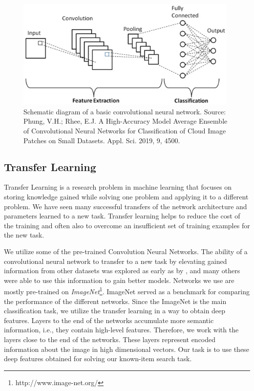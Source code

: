 \begin{figure}
    \centering
    \includegraphics[width=0.98\textwidth]{img/convolution_neural_network.jpg}
    \caption{Schematic diagram of a basic convolutional neural network. Source: Phung, V.H.; Rhee, E.J. A High-Accuracy Model Average Ensemble of Convolutional Neural Networks for Classification of Cloud Image Patches on Small Datasets. Appl. Sci. 2019, 9, 4500.}
    \label{fig:convolution_neural_network}
\end{figure}


\subsection{Transfer Learning}

Transfer Learning is a research problem in machine learning that focuses on storing knowledge gained while solving one problem and applying it to a different problem. We have seen many successful transfers of the network architecture and parameters learned to a new task. Transfer learning helps to reduce the cost of the training and often also to overcome an insufficient set of training examples for the new task.

We utilize some of the pre-trained Convolution Neural Networks. The ability of a convolutional neural network to transfer to a new task by elevating gained information from other datasets was explored as early as by \cite{donahuedeep}, and many others were able to use this information to gain better models.  Networks we use are mostly pre-trained on \emph{ImageNet}\footnote{http://www.image-net.org/}. ImageNet served as a benchmark for comparing the performance of the different networks. Since the ImageNet is the main classification task, we utilize the transfer learning in a way to obtain deep features. Layers to the end of the networks accumulate more semantic information, i.e., they contain high-level features. Therefore, we work with the layers close to the end of the networks. These layers represent encoded information about the image in high dimensional vectors. Our task is to use these deep features obtained for solving our known-item search task.



